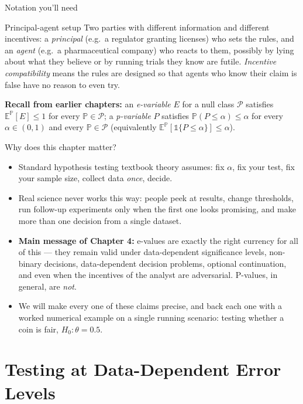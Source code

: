 \documentclass[aspectratio=169,10pt]{beamer}
\begin{document}
\begin{frame}[allowframebreaks]{Notation you'll need}
  \begin{block}{Principal-agent setup}
    Two parties with different information and different incentives:
    a \emph{principal} (e.g.\ a regulator granting licenses) who sets the
    rules, and an \emph{agent} (e.g.\ a pharmaceutical company) who reacts to
    them, possibly by lying about what they believe or by running trials they
    know are futile. \emph{Incentive compatibility} means the rules are
    designed so that agents who know their claim is false have no reason to
    even try.
  \end{block}

  \textbf{Recall from earlier chapters:} an \emph{e-variable} $E$ for a null
  class $\mathcal P$ satisfies $\mathbb{E}^{\mathbb P}[E]\le 1$ for every
  $\mathbb P\in\mathcal P$; a \emph{p-variable} $P$ satisfies
  $\mathbb{P}(P\le \alpha)\le\alpha$ for every $\alpha\in(0,1)$ and every
  $\mathbb P\in\mathcal P$ (equivalently $\mathbb E^{\mathbb P}[\mathbb 1\{P\le\alpha\}]\le\alpha$).
\end{frame}

\begin{frame}{Why does this chapter matter?}
  \begin{itemize}
    \item Standard hypothesis testing textbook theory assumes: fix $\alpha$,
    fix your test, fix your sample size, collect data \emph{once}, decide.
    \item Real science never works this way: people peek at results,
    change thresholds, run follow-up experiments only when the first one
    looks promising, and make more than one decision from a single dataset.
    \item \textbf{Main message of Chapter 4:} e-values are exactly the
    right currency for all of this --- they remain valid under
    data-dependent significance levels, non-binary decisions, data-dependent
    decision problems, optional continuation, and even when the incentives
    of the analyst are adversarial. P-values, in general, are \emph{not}.
    \item We will make every one of these claims precise, and back each one
    with a worked numerical example on a single running scenario: testing
    whether a coin is fair, $H_0:\theta=0.5$.
  \end{itemize}
\end{frame}

\section{Testing at Data-Dependent Error Levels}
\end{document}
